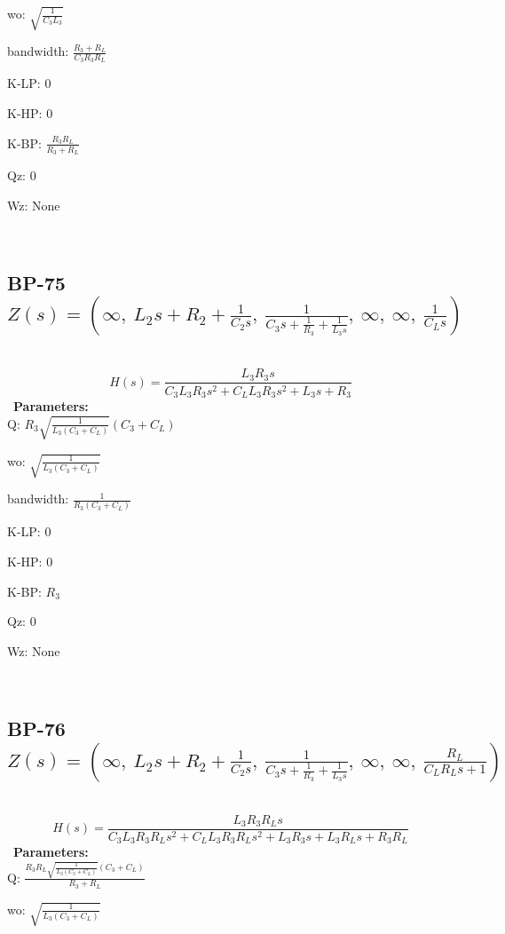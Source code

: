 \documentclass{article}
\begin{document}
wo: $\sqrt{\frac{1}{C_{3} L_{3}}}$\ 

bandwidth: $\frac{R_{3} + R_{L}}{C_{3} R_{3} R_{L}}$\ 

K-LP: $0$\ 

K-HP: $0$\ 

K-BP: $\frac{R_{3} R_{L}}{R_{3} + R_{L}}$\ 

Qz: $0$\ 

Wz: $\text{None}$\ 

\ 

\subsection{BP-75 $Z(s) = \left( \infty, \  L_{2} s + R_{2} + \frac{1}{C_{2} s}, \  \frac{1}{C_{3} s + \frac{1}{R_{3}} + \frac{1}{L_{3} s}}, \  \infty, \  \infty, \  \frac{1}{C_{L} s}\right)$ } \ 
\textbf{\[H(s) = \frac{L_{3} R_{3} s}{C_{3} L_{3} R_{3} s^{2} + C_{L} L_{3} R_{3} s^{2} + L_{3} s + R_{3}}\] } \ 
\textbf{Parameters:}\\ 

Q: $R_{3} \sqrt{\frac{1}{L_{3} \left(C_{3} + C_{L}\right)}} \left(C_{3} + C_{L}\right)$\ 

wo: $\sqrt{\frac{1}{L_{3} \left(C_{3} + C_{L}\right)}}$\ 

bandwidth: $\frac{1}{R_{3} \left(C_{3} + C_{L}\right)}$\ 

K-LP: $0$\ 

K-HP: $0$\ 

K-BP: $R_{3}$\ 

Qz: $0$\ 

Wz: $\text{None}$\ 

\ 

\subsection{BP-76 $Z(s) = \left( \infty, \  L_{2} s + R_{2} + \frac{1}{C_{2} s}, \  \frac{1}{C_{3} s + \frac{1}{R_{3}} + \frac{1}{L_{3} s}}, \  \infty, \  \infty, \  \frac{R_{L}}{C_{L} R_{L} s + 1}\right)$ } \ 
\textbf{\[H(s) = \frac{L_{3} R_{3} R_{L} s}{C_{3} L_{3} R_{3} R_{L} s^{2} + C_{L} L_{3} R_{3} R_{L} s^{2} + L_{3} R_{3} s + L_{3} R_{L} s + R_{3} R_{L}}\] } \ 
\textbf{Parameters:}\\ 

Q: $\frac{R_{3} R_{L} \sqrt{\frac{1}{L_{3} \left(C_{3} + C_{L}\right)}} \left(C_{3} + C_{L}\right)}{R_{3} + R_{L}}$\ 

wo: $\sqrt{\frac{1}{L_{3} \left(C_{3} + C_{L}\right)}}$\ 
\end{document}
